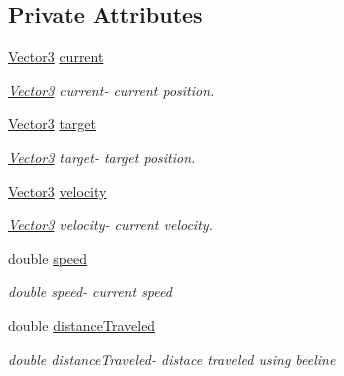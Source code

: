 \subsection*{Private Attributes}
\begin{DoxyCompactItemize}
\item 
\mbox{\label{classBeelineMovement_a78e1e59186f4e2082365c3d9816f96c5}} 
\hyperlink{classVector3}{Vector3} \hyperlink{classBeelineMovement_a78e1e59186f4e2082365c3d9816f96c5}{current}
\begin{DoxyCompactList}\small\item\em \hyperlink{classVector3}{Vector3} current-\/ current position. \end{DoxyCompactList}\item 
\mbox{\label{classBeelineMovement_a49239eec9d469db2fb34b4268a97da6e}} 
\hyperlink{classVector3}{Vector3} \hyperlink{classBeelineMovement_a49239eec9d469db2fb34b4268a97da6e}{target}
\begin{DoxyCompactList}\small\item\em \hyperlink{classVector3}{Vector3} target-\/ target position. \end{DoxyCompactList}\item 
\mbox{\label{classBeelineMovement_a5fe0d89a9bad2fa05e662080accf924b}} 
\hyperlink{classVector3}{Vector3} \hyperlink{classBeelineMovement_a5fe0d89a9bad2fa05e662080accf924b}{velocity}
\begin{DoxyCompactList}\small\item\em \hyperlink{classVector3}{Vector3} velocity-\/ current velocity. \end{DoxyCompactList}\item 
\mbox{\label{classBeelineMovement_a580f1c87f104f067fb1ad09dbe3a83af}} 
double \hyperlink{classBeelineMovement_a580f1c87f104f067fb1ad09dbe3a83af}{speed}
\begin{DoxyCompactList}\small\item\em double speed-\/ current speed \end{DoxyCompactList}\item 
\mbox{\label{classBeelineMovement_ad28d0dbbe30c429d3dd2b78c6c5c6a0f}} 
double \hyperlink{classBeelineMovement_ad28d0dbbe30c429d3dd2b78c6c5c6a0f}{distance\+Traveled}
\begin{DoxyCompactList}\small\item\em double distance\+Traveled-\/ distace traveled using beeline \end{DoxyCompactList}\end{DoxyCompactItemize}


